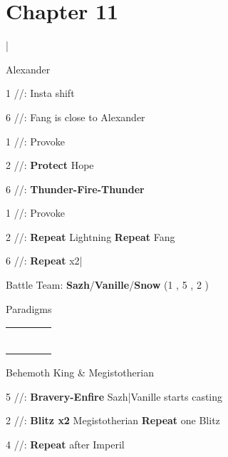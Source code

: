 \section{Chapter 11}

\begin{mainlist}
	\item {}|
\end{mainlist}
\begin{fight}{Alexander}
	\item [1] \rav/\med/\sen: Insta shift
	\item [6] \rav/\rav/\com: Fang is close to Alexander
	\item [1] \rav/\med/\sen: Provoke
	\item [2] \syn/\med/\sen: \textbf{Protect} Hope
	\item [6] \rav/\rav/\com: \textbf{Thunder-Fire-Thunder}
	\item [1] \rav/\med/\sen: Provoke
	\item [2] \syn/\med/\sen: \textbf{Repeat} Lightning \to \textbf{Repeat} Fang
	\item [6] \rav/\rav/\com: \textbf{Repeat} x2|
\end{fight}
\begin{menu}
	\item Battle Team: \textbf{Sazh}/\textbf{Vanille}/\textbf{Snow} (1 , 5 , 2 )
	\item Paradigms
	\begin{tabular}{cccl}
		\com          & \med          & \chrole{\com} &          \\
		\com          & \chrole{\sab} & \rav          &          \\
		\syn          & \med          & \chrole{\com} &          \\
		\mkrole{\com} & \chrole{\sab} & \com          &          \\
		\syn          & \mkrole{\sab} & \com          &  \\
		\mkrole{\com} & \rav          & \com          &
	\end{tabular}
\end{menu}
\begin{fight}{Behemoth King \& Megistotherian}
	\item [5] \syn/\sab/\com: \textbf{Bravery-Enfire} Sazh|Vanille starts casting
	\item [2] \com/\sab/\rav: \textbf{Blitz x2} Megistotherian \to \textbf{Repeat} one Blitz
	\item [4] \com/\sab/\com: \textbf{Repeat} after Imperil
\end{fight}
